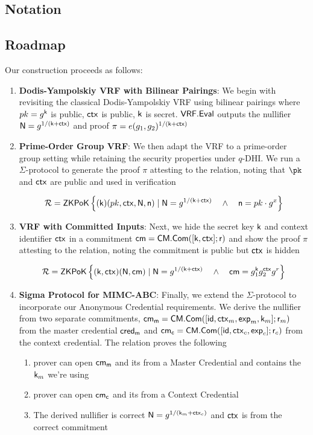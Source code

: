 \subsection*{Notation}


\subsection*{Roadmap}
Our construction proceeds as follows:
\begin{enumerate}
    \item \textbf{Dodis-Yampolskiy VRF with Bilinear Pairings}: We begin with revisiting the classical Dodis-Yampolskiy VRF using bilinear pairings where 
    $pk = g^{\mathsf{k}}$ is public, $\mathsf{ctx}$ is public, $\mathsf{k}$ is secret. $\mathsf{VRF.Eval}$ outputs the nullifier $\mathsf{N} = g^{1/(\mathsf{k}+\mathsf{ctx})}$ and proof $\pi = e(g_1, g_2)^{1/(\mathsf{k} + \mathsf{ctx})}$
    
    \item \textbf{Prime-Order Group VRF}: We then adapt the VRF to a prime-order group setting while retaining the security properties under $q$-DHI. We run a $\Sigma$-protocol to generate the proof $\pi$ attesting to the relation, noting that $\pk$ and $\mathsf{ctx}$ are public and used in verification

    \[
    \mathcal{R} = {\mathsf{ZKPoK}} \left\{ (\mathsf{k})(pk, \mathsf{ctx}, \mathsf{N}, \mathsf{n}) \mid \mathsf{N} = g^{1/(\mathsf{k} + \mathsf{ctx})} \quad \wedge \quad \mathsf{n} =  pk \cdot g^x  \right\}
    \]
    
    \item \textbf{VRF with Committed Inputs}: Next, we hide the secret key $\mathsf{k}$ and context identifier $\mathsf{ctx}$ in a commitment $\mathsf{cm} = \mathsf{CM.Com}([\mathsf{k}, \mathsf{ctx}]; \mathsf{r})$ and show the proof $\pi$ attesting to the relation, noting the commitment is public but $\mathsf{ctx}$ is hidden

    \[
    \mathcal{R} = {\mathsf{ZKPoK}} \left\{ (\mathsf{k}, \mathsf{ctx})(\mathsf{N}, \mathsf{cm}) \mid \mathsf{N} = g^{1/(\mathsf{k} + \mathsf{ctx})} \quad \wedge \quad \mathsf{cm} = g_1^{\mathsf{k}} g_2^{\mathsf{ctx}}g^r  \right\}
    \]

    \item \textbf{Sigma Protocol for MIMC-ABC}: Finally, we extend the $\Sigma$-protocol to incorporate our Anonymous Credential requirements. We derive the nullifier from two separate commitments, $\mathsf{cm_m} = \mathsf{CM.Com}([\mathsf{id}, \mathsf{ctx}_m, \mathsf{exp}_m, \mathsf{k}_m]; \mathsf{r}_m)$ from the master credential $\mathsf{cred_m}$ and $\mathsf{cm_c} = \mathsf{CM.Com}([\mathsf{id}, \mathsf{ctx}_c, \mathsf{exp}_c]; \mathsf{r}_c)$ from the context credential. The relation proves the following 
    \begin{enumerate}
        \item prover can open $\mathsf{cm_m}$ and its from a Master Credential and contains the $\mathsf{k}_m$ we're using %
        \item prover can open $\mathsf{cm_c}$ and its from a Context Credential
        \item The derived nullifier is correct $\mathsf{N} = g^{1/(\mathsf{k}_m + \mathsf{ctx}_c)}$ and $\mathsf{ctx}$ is from the correct commitment
    \end{enumerate}
    

\end{enumerate}

